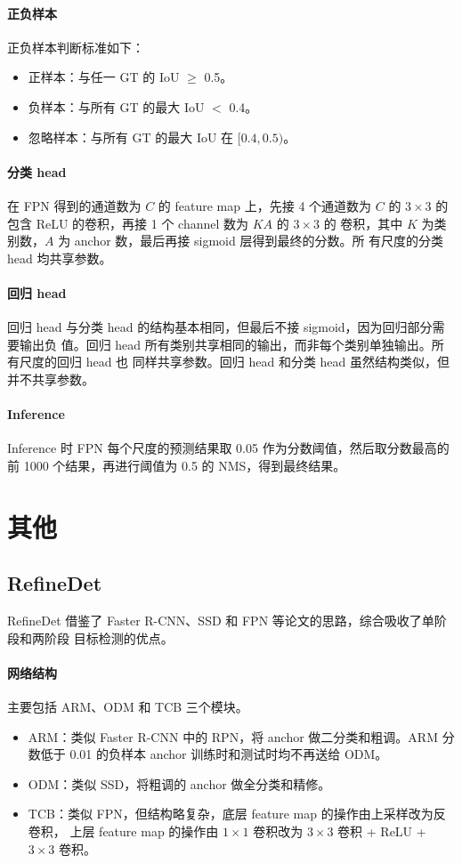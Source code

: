 \paragraph{正负样本}
正负样本判断标准如下：
\begin{itemize}
  \item 正样本：与任一 GT 的 IoU $\geq$ 0.5。
  \item 负样本：与所有 GT 的最大 IoU $ < $ 0.4。
  \item 忽略样本：与所有 GT 的最大 IoU 在 $[0.4, 0.5)$。
\end{itemize}

\paragraph{分类 head}
在 FPN 得到的通道数为 $C$ 的 feature map 上，先接 4 个通道数为 $C$ 的
$3 \times 3$ 的包含 ReLU 的卷积，再接 1 个 channel 数为 $KA$ 的 $3 \times 3$ 的
卷积，其中 $K$ 为类别数，$A$ 为 anchor 数，最后再接 sigmoid 层得到最终的分数。所
有尺度的分类 head 均共享参数。

\paragraph{回归 head}
回归 head 与分类 head 的结构基本相同，但最后不接 sigmoid，因为回归部分需要输出负
值。回归 head 所有类别共享相同的输出，而非每个类别单独输出。所有尺度的回归 head 也
同样共享参数。回归 head 和分类 head 虽然结构类似，但并不共享参数。

\paragraph{Inference}
Inference 时 FPN 每个尺度的预测结果取 0.05 作为分数阈值，然后取分数最高的前 1000
个结果，再进行阈值为 0.5 的 NMS，得到最终结果。

\section{其他}

\subsection{RefineDet}
RefineDet 借鉴了 Faster R-CNN、SSD 和 FPN 等论文的思路，综合吸收了单阶段和两阶段
目标检测的优点。

\paragraph{网络结构}
主要包括 ARM、ODM 和 TCB 三个模块。
\begin{itemize}
  \item ARM：类似 Faster R-CNN 中的 RPN，将 anchor 做二分类和粗调。ARM 分数低于
    0.01 的负样本 anchor 训练时和测试时均不再送给 ODM。
  \item ODM：类似 SSD，将粗调的 anchor 做全分类和精修。
  \item TCB：类似 FPN，但结构略复杂，底层 feature map 的操作由上采样改为反卷积，
    上层 feature map 的操作由 $1 \times 1$ 卷积改为 $3 \times 3$ 卷积 + ReLU +
    $3 \times 3$ 卷积。
\end{itemize}

